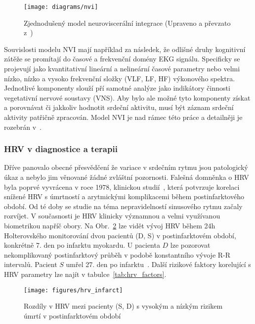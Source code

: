 \begin{figure}[h]
	\begin{center}
		\texttt{[image: diagrams/nvi]}
		\caption{Zjednodušený model neuroviscerální integrace (Upraveno a převzato z~\cite{NVI20017})}
		\label{fig:nvi_model}
	\end{center}
\end{figure}

Souvislosti modelu NVI mají například za následek, že odlišné druhy kognitivní
zátěže se promítají do časové a frekvenční domény EKG signálu. Specificky se
projevují jako kvantitativní lineární a nelineární časové parametry nebo velmi
nízko, nízko a vysoko frekvenční složky (VLF, LF, HF) výkonového spektra.
Jednotlivé komponenty slouží pří samotné analýze jako indikátory činnosti
vegetativní nervové soustavy (VNS). Aby bylo ale možné tyto komponenty získat a
porovnávat či jakkoliv hodnotit srdeční aktivitu, musí být záznam srdeční
aktivity patřičně zpracován. Model NVI je nad rámec této práce a detailněji je
rozebrán v~\cite{Smith2017}.

\subsubsection{HRV v diagnostice a terapii}
Dříve panovalo obecné přesvědčení že variace v srdečním rytmu jsou patologický
úkaz a nebylo jim věnované žádné zvláštní pozornosti. Falešná domněnka o HRV
byla poprvé vyvrácena v roce 1978, klinickou studií~\cite{Wolf1978}, která
potvrzuje korelaci snížené HRV s úmrtností a arytmickými komplikacemi během
postinfarktového období. Od té doby se studie na téma nepravidelností sinusového
rytmu začaly rozvíjet. V současnosti je HRV klinicky významnou a
velmi využívanou biometrikou napříč obory. Na Obr.~\ref{fig:hrv_infarct} lze
vidět vývoj HRV během 24h Holterovského monitorování dvou pacientů (D, S) v
postinfarktovém období, konkrétně 7. den po infarktu myokardu. U pacienta $D$
lze pozorovat nekomplikovaný postinfarktový průběh v podobě konstantního vývoje
R-R intervalů. Pacient $S$ umřel 27. den po infarktu~\cite{Malik1990}. Další
rizikové faktory korelující s HRV parametry lze najít v
tabulce~\ref{tab:hrv_factors}.

\begin{figure}[h]
	\begin{center}
		\texttt{[image: figures/hrv\_infarct]}
		\caption{Rozdíly v HRV mezi pacienty (S, D) s vysokým a nízkým rizikem úmrtí v
			postinfarktovém období \cite{Malik1990}}
		\label{fig:hrv_infarct}
	\end{center}
\end{figure}

